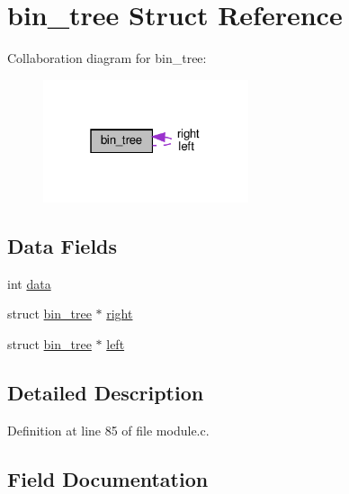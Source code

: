 \hypertarget{structbin__tree}{}\section{bin\+\_\+tree Struct Reference}
\label{structbin__tree}


Collaboration diagram for bin\+\_\+tree\+:
\nopagebreak
\begin{figure}[H]
\begin{center}
\leavevmode
\includegraphics[width=171pt]{d9/de4/structbin__tree__coll__graph}
\end{center}
\end{figure}
\subsection*{Data Fields}
\begin{DoxyCompactItemize}
\item 
int \hyperlink{structbin__tree_ad73c2c233665bff596250fbca2bb8bdb}{data}
\item 
struct \hyperlink{structbin__tree}{bin\+\_\+tree} $\ast$ \hyperlink{structbin__tree_a5cf772dd37b0389f1fc3716e6ce083a3}{right}
\item 
struct \hyperlink{structbin__tree}{bin\+\_\+tree} $\ast$ \hyperlink{structbin__tree_a7b0d1e87f884d550c649078178195734}{left}
\end{DoxyCompactItemize}


\subsection{Detailed Description}


Definition at line 85 of file module.\+c.



\subsection{Field Documentation}
\mbox{\label{structbin__tree_ad73c2c233665bff596250fbca2bb8bdb}} 
